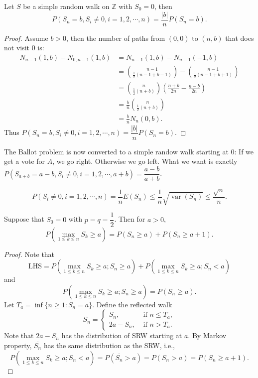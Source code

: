 \documentclass[11pt,singlecolumn, openany, citestyle=authoryear]{elegantbook}
\begin{document}
\begin{CJK}{UTF8}{gbsn}
\begin{theorem}
    Let $S$ be a simple random walk on $\mathbb{Z}$ with $S_0=0$, then 
    $$
    P(S_n=b,S_i\neq0,i=1,2,\cdots,n)=\frac{|b|}{n}P(S_n=b).
    $$
\end{theorem}
\begin{proof}
    Assume $b>0$, then the number of paths from $(0,0)$ to $(n,b)$
    that does not visit $0$ is:
    \begin{align*}
    N_{n-1}(1,b)-N_{0,n-1}(1,b)& =
    N_{n-1}(1,b)-N_{n-1}(-1,b)\\ 
    &=\binom{n-1}{\frac{1}{2}(n-1+b-1)}-
    \binom{n-1}{\frac{1}{2}(n-1+b+1)}\\
    &= \binom{n}{\frac{1}{2}(n+b)}\left(\frac{n+b}{2n}-\frac{n-b}{2n}\right) \\
    &=\frac{b}{n} \binom{n}{\frac{1}{2}(n+b)}\\
    &=\frac{b}{n} N_n(0,b).
    \end{align*}
    Thus $P(S_n=b,S_i\neq0,i=1,2,\cdots,n)=\dfrac{|b|}{n}P(S_n=b)$.
\end{proof}
The Ballot problem is now converted to a simple randow walk starting at $0$: 
If we get a vote for $A$, we go right. Otherwise we go left. What we want is 
exactly $P(S_{a+b}=a-b,S_i \neq 0, i =1,2,\cdots,a+b) = \dfrac{a-b}{a+b}$.
\begin{corollary}
    $$
    P(S_i\neq0,i=1,2,\cdots,n)=\frac{1}{n} E(S_n)\leqslant \frac{1}{n}\sqrt{\operatorname{var}(S_n)}
    \leqslant \frac{\sqrt{n}}{n}.
    $$
\end{corollary}

\begin{theorem}
    Suppose that $S_0=0$ with $p=q=\dfrac{1}{2}$. Then for $a>0$,
    $$
    P(\max_{1\leqslant k \leqslant n}S_k \geqslant a) = 
    P(S_n\geqslant a)+P(S_n\geqslant a+1).
    $$
\end{theorem}
\begin{proof}
    Note that 
    $$
        \text{LHS}=P(\max_{1\leqslant k\leqslant n}S_k \geqslant a; S_n\geqslant a)+
        P(\max_{1\leqslant k\leqslant n}S_k \geqslant a; S_n<a)
    $$
    and 
    $$
    P(\max_{1\leqslant k\leqslant n}S_k \geqslant a; S_n\geqslant a) = 
    P(S_n\geqslant a).
    $$
    Let $T_a=\inf\{n\geqslant 1:S_n = a\}$. Define the reflected walk 
    $$
    \overline{S_n} = 
    \begin{cases}
        S_n, & \text{ if } n\leqslant T_a,\\
        2a-S_n, & \text{ if } n>T_a.
    \end{cases}
    $$
    Note that $2a-S_n$ has the distribution of SRW starting at $a$.
    By Markov property, $\overline{S_n}$ has the same distribution as the SRW, i.e.,
    $$
    P(\max_{1\leqslant k \leqslant n}S_k\geqslant a; S_n<a) =
    P(\overline{S_n}>a)=P(S_n>a)=P(S_n\geqslant a+1).
    $$ 
\end{proof}


\end{CJK}
\end{document}
